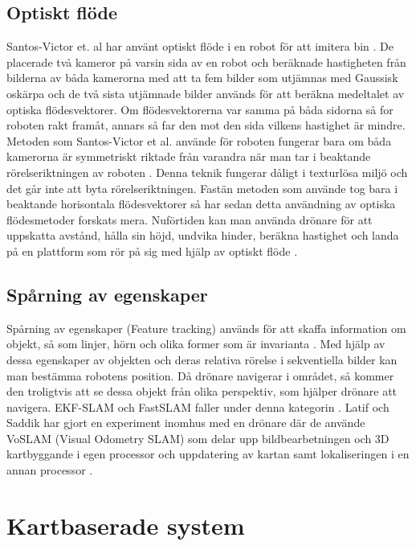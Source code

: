 \subsection{Optiskt flöde}

Santos-Victor et. al har använt optiskt flöde i en robot för att imitera bin \citep{341094}. De placerade två kameror på varsin sida av en robot och beräknade hastigheten från bilderna av båda kamerorna med att ta fem bilder som utjämnas med Gaussisk oskärpa och de två sista utjämnade bilder används för att beräkna medeltalet av optiska flödesvektorer. Om flödesvektorerna var samma på båda sidorna så for roboten rakt framåt, annars så far den mot den sida vilkens hastighet är mindre. Metoden som Santos-Victor et al. använde för roboten fungerar bara om båda kamerorna är symmetriskt riktade från varandra när man tar i beaktande rörelseriktningen av roboten \citep{982903}. Denna teknik fungerar dåligt i texturlösa miljö och det går inte att byta rörelseriktningen. Fastän metoden som \cite{341094} använde tog bara i beaktande horisontala flödesvektorer så har sedan detta användning av optiska flödesmetoder forskats mera. Nuförtiden kan man använda drönare för att uppskatta avstånd, hålla sin höjd, undvika hinder, beräkna hastighet och landa på en plattform som rör på sig med hjälp av optiskt flöde \citep{6564752}.

\subsection{Spårning av egenskaper}

Spårning av egenskaper (Feature tracking) används för att skaffa information om objekt, så som linjer, hörn och olika former som är invarianta \citep{geospatial}. Med hjälp av dessa egenskaper av objekten och deras relativa rörelse i sekventiella bilder kan man bestämma robotens position. Då drönare navigerar i området, så kommer den troligtvis att se dessa objekt från olika perspektiv, som hjälper drönare att navigera. EKF-SLAM och FastSLAM faller under denna kategorin \citep{8930783}. Latif och Saddik har gjort en experiment inomhus med en drönare där de använde VoSLAM (Visual Odometry SLAM) som delar upp bildbearbetningen och 3D kartbyggande i egen processor och uppdatering av kartan samt lokaliseringen i en annan processor \citep{8930783}.

\section{Kartbaserade system}

